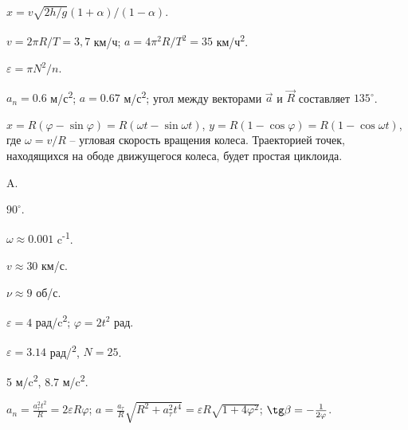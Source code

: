 \begin{Answer}{41}
$x = v \sqrt{2h/g} \left( 1 + \alpha \right) / \left( 1 - \alpha \right)$.
\end{Answer}
\begin{Answer}{42}
$v = 2 \pi R/T = 3,7$ км/ч; $a = 4\pi^2 R/T^2 = 35$ км/ч\textsuperscript{2}.
\end{Answer}
\begin{Answer}{43}
$\varepsilon = \pi N^2/n$.
\end{Answer}
\begin{Answer}{44}
$a_n = 0.6$ м/с\textsuperscript{2}; $a = 0.67$ м/с\textsuperscript{2}; угол между векторами $\vec{a}$ и $\vec{R}$ составляет $135^{\circ}$.
\end{Answer}
\begin{Answer}{45}
$x= R(\varphi - \sin \varphi) = R(\omega t - \sin \omega t)$, $y=R(1-\cos \varphi) = R(1-\cos \omega t)$, где $\omega = v/R$ -- угловая скорость вращения колеса. Траекторией точек, находящихся на ободе движущегося колеса, будет простая циклоида.
\end{Answer}
\begin{Answer}{54}
A.
\end{Answer}
\begin{Answer}{55}
$90^{\circ}$.
\end{Answer}
\begin{Answer}{58}
$\omega \approx 0.001$ c\textsuperscript{-1}.
\end{Answer}
\begin{Answer}{59}
$v \approx 30$ км/с.
\end{Answer}
\begin{Answer}{60}
$\nu \approx 9$ об/с.
\end{Answer}
\begin{Answer}{61}
$\varepsilon = 4$ рад/c\textsuperscript{2}; $\varphi = 2t^2$ рад.
\end{Answer}
\begin{Answer}{62}
$\varepsilon =  3.14$ рад/\textsuperscript{2}, $N = 25$.
\end{Answer}
\begin{Answer}{63}
5 м/c\textsuperscript{2}, 8.7 м/c\textsuperscript{2}.
\end{Answer}
\begin{Answer}{64}
$a_n = \frac{a_{\tau}^2 t^2}{R} = 2 \varepsilon R \varphi$; $a = \frac{a_{\tau}}{R} \sqrt{R^2 + a_{\tau}^2 t^4} = \varepsilon R \sqrt{1 + 4 \varphi^2}$; $\tg \beta = -\frac{1}{2\varphi}$.
\end{Answer}
